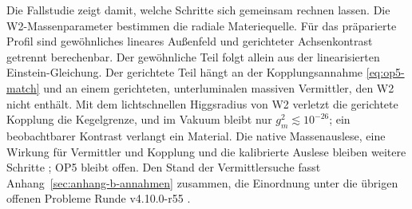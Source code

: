 Die Fallstudie zeigt damit, welche Schritte sich gemeinsam rechnen lassen. Die W2-Massenparameter bestimmen die radiale Materiequelle. Für das präparierte Profil sind gewöhnliches lineares Außenfeld und gerichteter Achsenkontrast getrennt berechenbar. Der gewöhnliche Teil folgt allein aus der linearisierten Einstein-Gleichung. Der gerichtete Teil hängt an der Kopplungsannahme \eqref{eq:op5-match} und an einem gerichteten, unterluminalen massiven Vermittler, den W2 nicht enthält. Mit dem lichtschnellen Higgsradius von W2 verletzt die gerichtete Kopplung die Kegelgrenze, und im Vakuum bleibt nur \(g_m^2\lesssim10^{-26}\); ein beobachtbarer Kontrast verlangt ein Material. Die native Massenauslese, eine Wirkung für Vermittler und Kopplung und die kalibrierte Auslese bleiben weitere Schritte \cite{op5}; OP5 bleibt offen. Den Stand der Vermittlersuche fasst Anhang~\ref{sec:anhang-b-annahmen} zusammen, die Einordnung unter die übrigen offenen Probleme Runde v4.10.0-r55 \cite{crossmap}.
